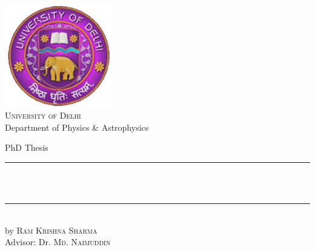 \begin{titlepage}
	\begin{addmargin}[-1cm]{-1cm}
    \begin{center}
        \large
    \includegraphics[width=0.35\textwidth]{figures/logo_du.jpg}\\
        \vfill
        {\Large \textsc{University of Delhi}}\\[1ex]
        Department of Physics \& Astrophysics\\

        \vfill

        PhD Thesis\\ \vskip1cm
        \rule{14cm}{0.4pt} \\ \bigskip
            \textbf{\Large{\color{Maroon}{Search for Anomalous Gauge Coupling through Vector Boson Scattering and Development of the GEM Detectors at the CMS Experiment}}} \\ \bigskip
        \rule{14cm}{0.4pt}\\ \vskip1cm
        by \textsc{Ram Krishna Sharma}\\
        \vfill
        Advisor: Dr. \textsc{Md. Naimuddin}\\

        \vfill

    \end{center}
  \end{addmargin}
\end{titlepage}